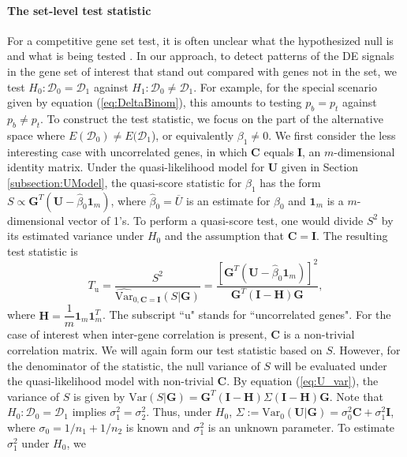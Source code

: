 	\paragraph{The set-level test statistic}\label{subsection:MEQL}
	For a competitive gene set test, it is often unclear what the hypothesized null is and what is
	being tested \citep{barry2008statistical,wu2012camera}. In our approach, to detect patterns of 
	the DE signals in the gene set of interest that stand out compared with genes not in the set, 
	we test $H_0: \mathscr{D}_0=\mathscr{D}_1$ against $H_1: \mathscr{D}_0\ne\mathscr{D}_1$. For 
	example, for the special scenario given by equation (\ref{eq:DeltaBinom}), this amounts to 
	testing $p_{b}=p_{t}$ against $p_{b}\ne p_{t}$.
	To construct the test statistic, we focus on the part of the alternative space where
	$E(\mathscr{D}_0)\ne E(\mathscr{D}_1$), or equivalently $\beta_1\ne 0$. We first consider the 
	less
	interesting case with uncorrelated genes, in which $\bm C$ equals $\bm I$, an $m$-dimensional
	identity matrix. Under the quasi-likelihood model for $\bm U$ given in Section
	\ref{subsection:UModel},  the quasi-score statistic for $\beta_1$ has the form $S \propto \bm
	G^T(\bm U-\hat\beta_0\bm 1_m)$, where $\hat\beta_0=\overline{U}$ is an estimate for $\beta_0$ 
	and
	$\bm 1_m$ is a $m$-dimensional vector of 1's. To perform a quasi-score test, one would divide 
	$S^2$
	by its estimated variance under $H_0$ and the assumption that $\bm C=\bm I$. The resulting test
	statistic is 
	\begin{equation}
	T_{\text{u}} = \dfrac{S^2}{\widehat{\mbox{Var}}_{0, \bm C=\bm I}(S|\bm G)} = \dfrac{[\bm G^T(\bm
		U-\hat\beta_0\bm 1_m)]^2}{\bm G^T(\bm I-\bm H)\bm G}, 
	\end{equation}
	where $\bm H = \dfrac{1}{m}\bm 1_m\bm 1_m^T$. The subscript ``u" stands for ``uncorrelated 
	genes".
	For the case of interest when inter-gene correlation is present, $\bm C$ is a non-trivial
	correlation matrix. We will again form our test statistic based on $S$. However, for the
	denominator of the statistic, the null variance of $S$ will be evaluated under the 
	quasi-likelihood
	model with non-trivial $\bm C$. By equation (\ref{eq:U_var}), the variance of $S$ is given by
	$\mbox{Var}(S|\bm G) = \bm G^T(\bm I-\bm H)\Sigma(\bm I-\bm H)\bm G$. Note that $H_0:
	\mathscr{D}_0=\mathscr{D}_1$ implies $\sigma_1^2=\sigma_2^2$. Thus, under $H_0$,
	$\Sigma:=\mbox{Var}_{0}(\bm U|\bm G)=\sigma_0^2\bm C+\sigma_1^2\bm I$, where 
	$\sigma_0=1/n_1+1/n_2$
	is known and $\sigma_1^2$ is an unknown parameter. To estimate $\sigma_1^2$ under $H_0$, we 
